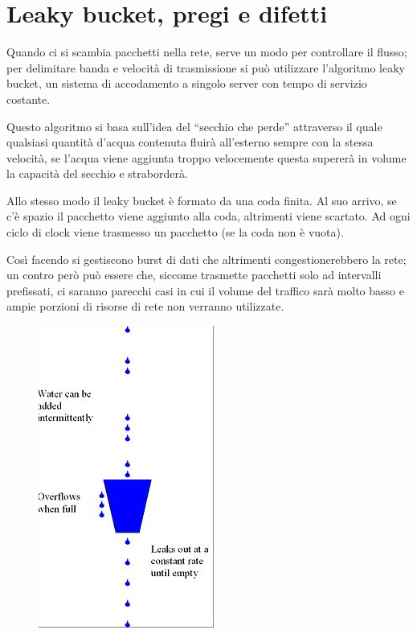 \section{Leaky bucket, pregi e difetti}

Quando ci si scambia pacchetti nella rete, serve un modo per controllare il flusso; per delimitare banda e velocità di trasmissione si può utilizzare l’algoritmo leaky bucket, un sistema di accodamento a singolo server con tempo di servizio costante.

Questo algoritmo si basa sull’idea del “secchio che perde” attraverso il quale qualsiasi quantità d’acqua contenuta fluirà all’esterno sempre con la stessa velocità, se l’acqua viene aggiunta troppo velocemente questa supererà in volume la capacità del secchio e straborderà.

Allo stesso modo il leaky bucket è formato da una coda finita. Al suo arrivo, se c’è spazio il pacchetto viene aggiunto alla coda, altrimenti viene scartato. Ad ogni ciclo di clock viene trasmesso un pacchetto (se la coda non è vuota).

Così facendo si gestiscono burst di dati che altrimenti congestionerebbero la rete; un contro però può essere che, siccome trasmette pacchetti solo ad intervalli prefissati, ci saranno parecchi casi in cui il volume del traffico sarà molto basso e ampie porzioni di risorse di rete non verranno utilizzate.

\begin{figure}[H]
\centering
\includegraphics[scale=0.6]{res/img/41_LeakyBucket.png}
\end{figure}

